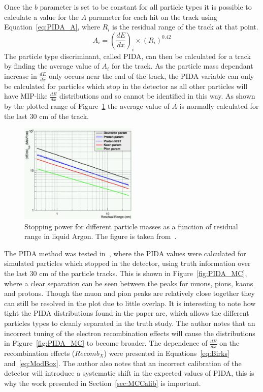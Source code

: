 Once the $b$ parameter is set to be constant for all particle types it is possible to calculate a value for the $A$ parameter for each hit on the track using Equation~\ref{eq:PIDA_A}, where $R_i$ is the residual range of the track at that point.
\begin{equation}
  \label{eq:PIDA_A}
  A_i = \left(\frac{dE}{dx}\right)_i \times \left(R_{i}\right)^{0.42}
\end{equation}
The particle type discriminant, called PIDA, can then be calculated for a track by finding the average value of $A_i$ for the track. As the particle mass dependant increase in $\frac{dE}{dx}$ only occurs near the end of the track, the PIDA variable can only be calculated for particles which stop in the detector as all other particles will have MIP-like $\frac{dE}{dx}$ distributions and so cannot be identified in this way. As shown by the plotted range of Figure~\ref{fig:PIDA_loglog} the average value of $A$ is normally calculated for the last 30 cm of the track. \\

\begin{figure}[h!]
  \centering
  \includegraphics[width=0.5\textwidth]{StoppingPower}
  \caption[Stopping power for different particle masses as a function of residual range in liquid Argon]
          {Stopping power for different particle masses as a function of residual range in liquid Argon. The figure is taken from~\citep{PIDA_Paper}.}
  \label{fig:PIDA_loglog}
\end{figure}

The PIDA method was tested in~\citep{PIDA_Paper}, where the PIDA values were calculated for simulated particles which stopped in the detector, using truth information over the last 30 cm of the particle tracks. This is shown in Figure~\ref{fig:PIDA_MC}, where a clear separation can be seen between the peaks for muons, pions, kaons and protons. Though the muon and pion peaks are relatively close together they can still be resolved in the plot due to little overlap. It is interesting to note how tight the PIDA distributions found in the paper are, which allows the different particles types to cleanly separated in the truth study. The author notes that an incorrect tuning of the electron recombination effects will cause the distributions in Figure~\ref{fig:PIDA_MC} to become broader. The dependence of $\frac{dE}{dx}$ on the recombination effects ($Recomb_{X}$) were presented in Equations~\ref{eq:Birks} and~\ref{eq:ModBox}. The author also notes that an incorrect calibration of the detector will introduce a systematic shift in the expected values of PIDA, this is why the work presented in Section~\ref{sec:MCCalib} is important. \\

